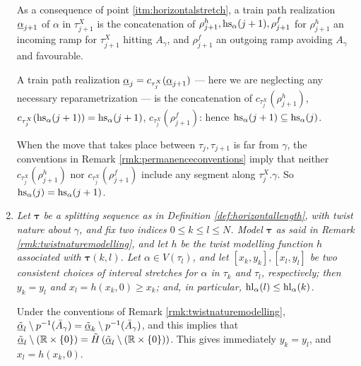 \begin{enumerate}
As a consequence of point \ref{itm:horizontalstretch}, a train path realization $\underline{\alpha}_{j+1}$ of $\alpha$ in $\tau_{j+1}^X$ is the concatenation of $\rho^h_{j+1},\mathrm{hs}_\alpha(j+1),\rho^f_{j+1}$ for $\rho^h_{j+1}$ an incoming ramp for $\tau_{j+1}^X$ hitting $A_\gamma$, and $\rho^f_{j+1}$ an outgoing ramp avoiding $A_\gamma$ and favourable.

A train path realization $\underline{\alpha}_j=c_{\tau_j^X}(\underline{\alpha}_{j+1})$ --- here we are neglecting any necessary reparametrization --- is the concatenation of $c_{\tau_j^X}(\rho^h_{j+1})$, $c_{\tau_j^X}(\hs_\alpha(j+1))=\linebreak\hs_\alpha(j+1)$, $c_{\tau_j^X}(\rho^f_{j+1})$: hence $\mathrm{hs}_\alpha(j+1)\subseteq \mathrm{hs}_\alpha(j)$.

When the move that takes place between $\tau_j,\tau_{j+1}$ is far from $\gamma$, the conventions in Remark \ref{rmk:permanenceconventions} imply that neither $c_{\tau_j^X}(\rho^h_{j+1})$ nor $c_{\tau_j^X}(\rho^f_{j+1})$ include any segment along $\tau_j^X.\gamma$. So $\mathrm{hs}_\alpha(j)=\mathrm{hs}_\alpha(j+1)$.

\item\label{itm:twistnaturehl} \textit{Let $\bm\tau$ be a splitting sequence as in Definition \ref{def:horizontallength}, with twist nature about $\gamma$, and fix two indices $0\leq k\leq l\leq N$. Model $\bm\tau$ as said in Remark \ref{rmk:twistnaturemodelling}, and let $h$ be the twist modelling function $h$ associated with $\bm\tau(k,l)$. Let $\alpha\in V(\tau_l)$, and let $[x_k,y_k],[x_l,y_l]$ be two consistent choices of interval stretches for $\alpha$ in $\tau_k$ and $\tau_l$, respectively; then $y_k=y_l$ and $x_l=h(x_k,0)\geq x_k$; and, in particular, $\mathrm{hl}_\alpha(l)\leq \mathrm{hl}_\alpha(k)$.}

Under the conventions of Remark \ref{rmk:twistnaturemodelling}, $\underline{\tilde\alpha}_l\setminus p^{-1}(\bar A_\gamma)= \underline{\tilde\alpha}_k\setminus p^{-1}(\bar A_\gamma)$, and this implies that $\underline{\tilde\alpha}_l\setminus(\mathbb R\times\{0\})=\tilde H\left(\underline{\tilde\alpha}_l\setminus(\mathbb R\times\{0\})\right)$. This gives immediately $y_k=y_l$, and $x_l=h(x_k,0)$.
\end{enumerate}

